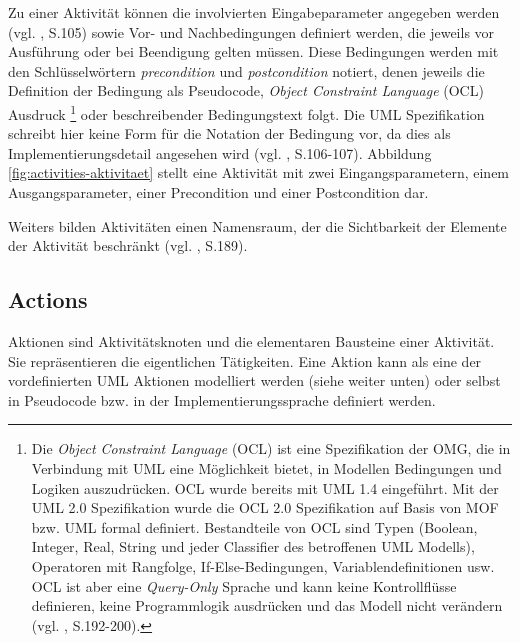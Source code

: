 Zu einer Aktivität können die involvierten Eingabeparameter angegeben werden (vgl. \citep{PilonePitman2005}, S.105) sowie Vor- und Nachbedingungen definiert werden, die jeweils vor Ausführung oder bei Beendigung gelten müssen. Diese Bedingungen werden mit den Schlüsselwörtern \emph{precondition} und \emph{postcondition} notiert, denen jeweils die Definition der Bedingung als Pseudocode, \emph{Object Constraint Language} (OCL) Ausdruck
\footnote{Die \emph{Object Constraint Language} (OCL) ist eine Spezifikation der OMG, die in Verbindung mit UML eine Möglichkeit bietet, in Modellen Bedingungen und Logiken auszudrücken. OCL wurde bereits mit UML 1.4 eingeführt. Mit der UML 2.0 Spezifikation wurde die OCL 2.0 Spezifikation auf Basis von MOF bzw. UML formal definiert. Bestandteile von OCL sind Typen (Boolean, Integer, Real, String und jeder Classifier des betroffenen UML Modells), Operatoren mit Rangfolge, If-Else-Bedingungen, Variablendefinitionen usw. OCL ist aber eine \emph{Query-Only} Sprache und kann keine Kontrollflüsse definieren, keine Programmlogik ausdrücken und das Modell nicht verändern (vgl. \citep{PilonePitman2005}, S.192-200).}
oder beschreibender Bedingungstext folgt. Die UML Spezifikation schreibt hier keine Form für die Notation der Bedingung vor, da dies als Implementierungsdetail angesehen wird (vgl. \citep{PilonePitman2005}, S.106-107). Abbildung \ref{fig:activities-aktivitaet} stellt eine Aktivität mit zwei Eingangsparametern, einem Ausgangsparameter, einer Precondition und einer Postcondition dar.

Weiters bilden Aktivitäten einen Namensraum, der die Sichtbarkeit der Elemente der Aktivität beschränkt (vgl. \citep{HitzEtAl2005}, S.189).


\subsection{Actions}
Aktionen sind Aktivitätsknoten und die elementaren Bausteine einer Aktivität. Sie repräsentieren die eigentlichen Tätigkeiten. Eine Aktion kann als eine der vordefinierten UML Aktionen modelliert werden (siehe weiter unten) oder selbst in Pseudocode bzw. in der Implementierungssprache definiert werden.


